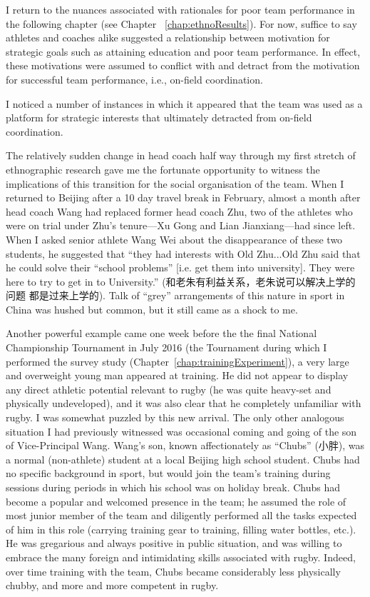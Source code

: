 \begin{CJK}{UTF8}{gbsn}
I return to the nuances associated with rationales for poor team performance in the following chapter (see Chapter ~\ref{chap:ethnoResults}).  For now, suffice to say athletes and coaches alike suggested a relationship between motivation for strategic goals such as attaining education and poor team performance.   In effect, these motivations were assumed to conflict with and detract from the motivation for successful team performance, i.e., on-field coordination.


I noticed a number of instances in which it appeared that the team was used as a platform for strategic interests that ultimately detracted from on-field coordination.

The relatively sudden change in head coach half way through my first stretch of ethnographic research gave me the fortunate opportunity to witness the implications of this transition for the social organisation of the team.  When I returned to Beijing after a 10 day travel break in February, almost a month after head coach Wang had replaced former head coach Zhu, two of the athletes who were on trial under Zhu's tenure---Xu Gong and Lian Jianxiang---had since left.  When I asked senior athlete Wang Wei about the disappearance of these two students, he suggested that ``they had interests with Old Zhu...Old Zhu said that he could solve their ``school problems'' [i.e. get them into university]. They were here to try to get in to University.'' (和老朱有利益关系，老朱说可以解决上学的问题 都是过来上学的).
Talk of ``grey'' arrangements of this nature in sport in China was hushed but common, but it still came as a shock to me.

Another powerful example came one week before the the final National Championship Tournament in July 2016 (the Tournament during which I performed the survey study (Chapter~\ref{chap:trainingExperiment}), a very large and overweight young man appeared at training.  He did not appear to display any direct athletic potential relevant to rugby (he was quite heavy-set and physically undeveloped), and it was also clear that he completely unfamiliar with rugby.  I was somewhat puzzled by this new arrival.  The only other analogous situation I had previously witnessed was occasional coming and going of the son of Vice-Principal Wang. Wang's son, known affectionately as ``Chubs'' (小胖), was a normal (non-athlete) student at a local Beijing high school student.  Chubs had no specific background in sport, but would join the team's training during sessions during periods in which his school was on holiday break.  Chubs had become a popular and welcomed presence in the team; he assumed the role of most junior member of the team and diligently performed all the tasks expected of him in this role (carrying training gear to training, filling water bottles, etc.). He was gregarious and always positive in public situation, and was willing to embrace the many foreign and intimidating skills associated with rugby. Indeed, over time training with the team, Chubs became considerably less physically chubby, and more and more competent in rugby.


\end{CJK}
